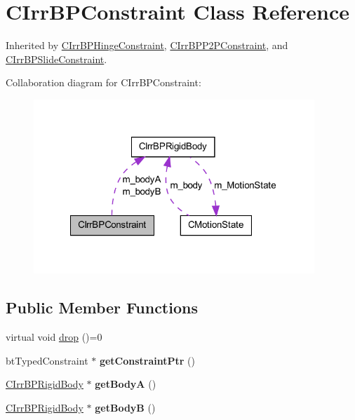 \hypertarget{class_c_irr_b_p_constraint}{
\section{CIrrBPConstraint Class Reference}
\label{class_c_irr_b_p_constraint}
}


Inherited by \hyperlink{class_c_irr_b_p_hinge_constraint}{CIrrBPHingeConstraint}, \hyperlink{class_c_irr_b_p_p2_p_constraint}{CIrrBPP2PConstraint}, and \hyperlink{class_c_irr_b_p_slide_constraint}{CIrrBPSlideConstraint}.



Collaboration diagram for CIrrBPConstraint:\nopagebreak
\begin{figure}[H]
\begin{center}
\leavevmode
\includegraphics[width=300pt]{class_c_irr_b_p_constraint__coll__graph}
\end{center}
\end{figure}
\subsection*{Public Member Functions}
\begin{DoxyCompactItemize}
\item 
virtual void \hyperlink{class_c_irr_b_p_constraint_a2718ef7118d60646a5cfa2dfe5a44795}{drop} ()=0
\item 
\hypertarget{class_c_irr_b_p_constraint_acfb5d4e8b25c91e150af372f4bd9187e}{
btTypedConstraint $\ast$ {\bfseries getConstraintPtr} ()}
\label{class_c_irr_b_p_constraint_acfb5d4e8b25c91e150af372f4bd9187e}

\item 
\hypertarget{class_c_irr_b_p_constraint_ac109e0c136271d9c002c5521a2eacc15}{
\hyperlink{class_c_irr_b_p_rigid_body}{CIrrBPRigidBody} $\ast$ {\bfseries getBodyA} ()}
\label{class_c_irr_b_p_constraint_ac109e0c136271d9c002c5521a2eacc15}

\item 
\hypertarget{class_c_irr_b_p_constraint_a0774899cfd927b7dcf7d1ab45552c122}{
\hyperlink{class_c_irr_b_p_rigid_body}{CIrrBPRigidBody} $\ast$ {\bfseries getBodyB} ()}
\label{class_c_irr_b_p_constraint_a0774899cfd927b7dcf7d1ab45552c122}

\end{DoxyCompactItemize}
